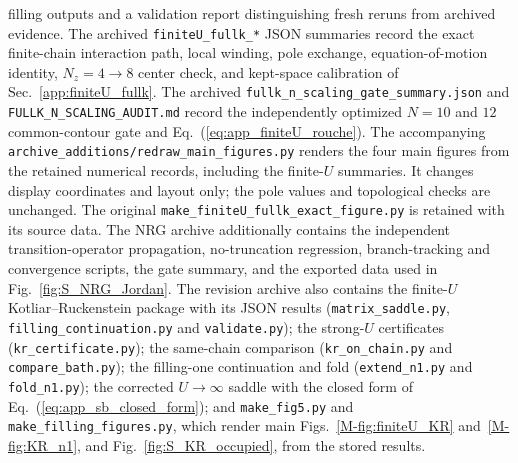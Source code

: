 \documentclass[%
  aps,physrev,onecolumn,10pt,amsmath,amssymb,superscriptaddress,longbibliography,floatfix
]{revtex4-2}
\begin{document}
filling outputs and a validation report distinguishing fresh reruns from
archived evidence.
The archived \nolinkurl{finiteU_fullk_*} JSON summaries record the exact
finite-chain interaction path, local winding, pole exchange,
equation-of-motion identity, \(N_z=4\to8\) center check, and kept-space
calibration of Sec.~\ref{app:finiteU_fullk}.
The archived \nolinkurl{fullk_n_scaling_gate_summary.json} and
\nolinkurl{FULLK_N_SCALING_AUDIT.md} record the independently optimized
$N=10$ and $12$ common-contour gate and Eq.~(\ref{eq:app_finiteU_rouche}).
The accompanying \nolinkurl{archive_additions/redraw_main_figures.py} renders
the four main figures from the retained numerical records, including the
finite-$U$ summaries.  It changes display coordinates and layout only; the pole
values and topological checks are unchanged.  The original
\nolinkurl{make_finiteU_fullk_exact_figure.py} is retained with its source
data.
The NRG archive additionally contains the independent transition-operator
propagation, no-truncation regression, branch-tracking and convergence
scripts, the gate summary, and the exported data used in
Fig.~\ref{fig:S_NRG_Jordan}.
The revision archive also contains the finite-$U$ Kotliar--Ruckenstein package
with its JSON results (\nolinkurl{matrix_saddle.py},
\nolinkurl{filling_continuation.py} and \nolinkurl{validate.py}); the
strong-$U$ certificates (\nolinkurl{kr_certificate.py}); the same-chain
comparison (\nolinkurl{kr_on_chain.py} and \nolinkurl{compare_bath.py}); the
filling-one continuation and fold (\nolinkurl{extend_n1.py} and
\nolinkurl{fold_n1.py}); the corrected $U\to\infty$ saddle with the closed form
of Eq.~(\ref{eq:app_sb_closed_form}); and \nolinkurl{make_fig5.py} and
\nolinkurl{make_filling_figures.py}, which render main
Figs.~\ref{M-fig:finiteU_KR} and~\ref{M-fig:KR_n1}, and
Fig.~\ref{fig:S_KR_occupied}, from the stored results.

\makeatletter
\write@bibliographystyle
\makeatother


\makeatletter
\NAT@swatrue\let\bibcite\NAT@testdef
\makeatother
\end{document}
